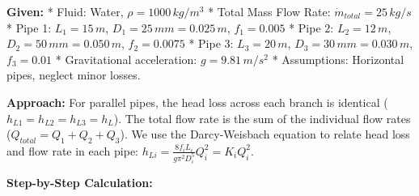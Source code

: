 \textbf{Given:} * Fluid: Water, \(\rho = 1000 \, kg/m^3\) * Total Mass
Flow Rate: \(\dot{m}_{total} = 25 \, kg/s\) * Pipe 1: \(L_1 = 15 \, m\),
\(D_1 = 25 \, mm = 0.025 \, m\), \(f_1 = 0.005\) * Pipe 2:
\(L_2 = 12 \, m\), \(D_2 = 50 \, mm = 0.050 \, m\), \(f_2 = 0.0075\) *
Pipe 3: \(L_3 = 20 \, m\), \(D_3 = 30 \, mm = 0.030 \, m\),
\(f_3 = 0.01\) * Gravitational acceleration: \(g = 9.81 \, m/s^2\) *
Assumptions: Horizontal pipes, neglect minor losses.

\textbf{Approach:} For parallel pipes, the head loss across each branch
is identical (\(h_{L1} = h_{L2} = h_{L3} = h_L\)). The total flow rate
is the sum of the individual flow rates
(\(Q_{total} = Q_1 + Q_2 + Q_3\)). We use the Darcy-Weisbach equation to
relate head loss and flow rate in each pipe:
\(h_{Li} = \frac{8 f_i L_i}{g \pi^2 D_i^5} Q_i^2 = K_i Q_i^2\).

\textbf{Step-by-Step Calculation:}

